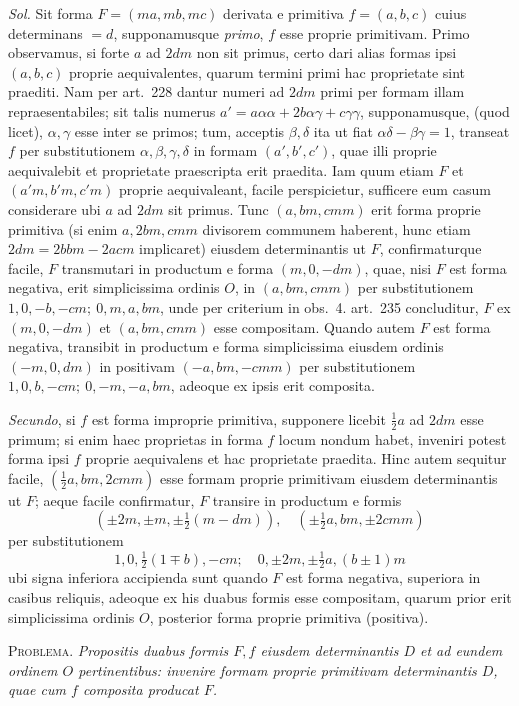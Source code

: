 \textit{Sol.} Sit forma $F=(ma,mb,mc)$ derivata e primitiva $f=(a,b,c)$ cuius determinans $=d$, supponamusque \textit{primo}, $f$ esse proprie primitivam. Primo observamus, si forte $a$ ad $2dm$ non sit primus, certo dari alias formas ipsi $(a,b,c)$ proprie aequivalentes, quarum termini primi hac proprietate sint praediti. Nam per art.~228 dantur numeri ad $2dm$ primi per formam illam repraesentabiles; sit talis numerus $a'=a\alpha\alpha+2b\alpha\gamma+c\gamma\gamma$, supponamusque, (quod licet), $\alpha,\gamma$ esse inter se primos; tum, acceptis $\beta,\delta$ ita ut fiat $\alpha\delta-\beta\gamma=1$, transeat $f$ per substitutionem $\alpha,\beta,\gamma,\delta$ in formam $(a',b',c')$, quae illi proprie aequivalebit et proprietate praescripta erit praedita. Iam quum etiam $F$ et $(a'm,b'm,c'm)$ proprie aequivaleant, facile perspicietur, sufficere eum casum considerare ubi $a$ ad $2dm$ sit primus. Tunc $(a,bm,cmm)$ erit forma proprie primitiva (si enim $a,2bm,cmm$ divisorem communem haberent, hunc etiam $2dm=2bbm-2acm$ implicaret) eiusdem determinantis ut $F$, confirmaturque facile, $F$ transmutari in productum e forma $(m,0,-dm)$, quae, nisi $F$ est forma negativa, erit simplicissima ordinis $O$, in $(a,bm,cmm)$ per substitutionem $1,0,-b,-cm;\ 0,m,a,bm$, unde per criterium in obs.~4. art.~235 concluditur, $F$ ex $(m,0,-dm)$ et $(a,bm,cmm)$ esse compositam. Quando autem $F$ est forma negativa, transibit in productum e forma simplicissima eiusdem ordinis $(-m,0,dm)$ in positivam $(-a,bm,-cmm)$ per substitutionem $1,0,b,-cm;\ 0,-m,-a,bm$, adeoque ex ipsis erit composita.

\textit{Secundo}, si $f$ est forma improprie primitiva, supponere licebit $\frac{1}{2}a$ ad $2dm$ esse primum; si enim haec proprietas in forma $f$ locum nondum habet, inveniri potest forma ipsi $f$ proprie aequivalens et hac proprietate praedita. Hinc autem sequitur facile, $(\frac{1}{2}a,bm,2cmm)$ esse formam proprie primitivam eiusdem determinantis ut $F$; aeque facile confirmatur, $F$ transire in productum e formis
\[
(\pm2m,\pm m,\pm\tfrac{1}{2}(m-dm)),\quad
(\pm\tfrac{1}{2}a,bm,\pm2cmm)
\]
per substitutionem
\[
1,0,\tfrac{1}{2}(1\mp b),-cm;\quad 0,\pm2m,\pm\tfrac{1}{2}a,(b\pm1)m
\]
ubi signa inferiora accipienda sunt quando $F$ est forma negativa, superiora in casibus reliquis, adeoque ex his duabus formis esse compositam, quarum prior erit simplicissima ordinis $O$, posterior forma proprie primitiva (positiva).

\textsc{Problema.} \textit{Propositis duabus formis $F,f$ eiusdem determinantis $D$ et ad eundem ordinem $O$ pertinentibus: invenire formam proprie primitivam determinantis $D$, quae cum $f$ composita producat $F$.}

